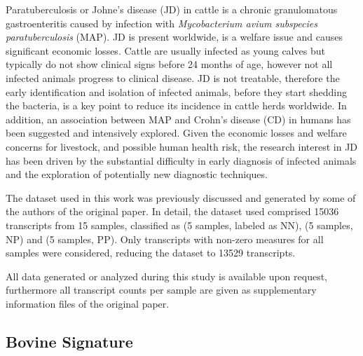 \documentclass{standalone}
\begin{document}
Paratuberculosis or Johne's disease (JD) in cattle is a chronic granulomatous gastroenteritis caused by infection with \emph{Mycobacterium avium subspecies paratuberculosis} (MAP).
JD is present worldwide, is a welfare issue and causes significant economic losses.
Cattle are usually infected as young calves but typically do not show clinical signs before 24 months of age, however not all infected animals progress to clinical disease.
JD is not treatable, therefore the early identification and isolation of infected animals, before they start shedding the bacteria, is a key point to reduce its incidence in cattle herds worldwide.
In addition, an association between MAP and Crohn's disease (CD) in humans has been suggested and intensively explored.
Given the economic losses and welfare concerns for livestock, and possible human health risk, the research interest in JD has been driven by the substantial difficulty in early diagnosis of infected animals and the exploration of potentially new diagnostic techniques.

The dataset used in this work was previously discussed and generated by some of the authors of the original paper.
In detail, the dataset used comprised 15036 transcripts from 15 samples, classified as  (5 samples, labeled as NN),  (5 samples, NP) and  (5 samples, PP).
Only transcripts with non-zero measures for all samples were considered, reducing the dataset to 13529 transcripts.

All data generated or analyzed during this study is available upon request, furthermore all transcript counts per sample are given as supplementary information files of the original paper.



\subsection[Results]{Bovine Signature}\label{bovine_result}
\end{document}
